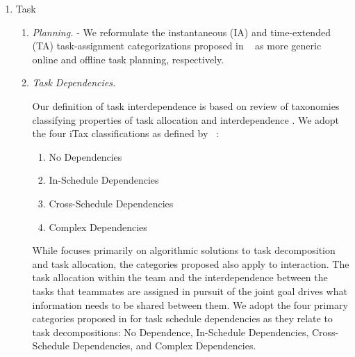 \documentclass[letterpaper, 10 pt, conference]{ieeeconf}  %
\theoremstyle{definition}
\newcommand{\citet}[1]{\citeauthor{#1}~\cite{#1}}
\begin{document}
\begin{enumerate}
    \item Task
    
    
        \begin{enumerate}
            \item \textit{Planning.} \cite{Korsah2013, GerkeyMataric2004} -
            We reformulate the instantaneous (IA) and time-extended (TA) task-assignment categorizations proposed in \citet{GerkeyMataric2004, Korsah2013} as more generic online and offline task planning, respectively.
            
            \item \textit{Task Dependencies.} 

            Our definition of task interdependence is based on review of taxonomies classifying properties of task allocation and interdependence \cite{Korsah2013, GerkeyMataric2004, Phillips2015, Phillips2012}. We adopt the four iTax classifications as defined by \citet{Korsah2013}:
            
            \begin{enumerate}
                \item No Dependencies
                \item In-Schedule Dependencies
                \item Cross-Schedule Dependencies
                \item Complex Dependencies
            \end{enumerate}
            
            
            While \cite{Korsah2013} focuses primarily on algorithmic solutions to task decomposition and task allocation, the categories proposed also apply to interaction. The task allocation within the team and the interdependence between the tasks that teammates are assigned in pursuit of the joint goal drives what information needs to be shared between them. We adopt the four primary categories proposed in \cite{Korsah2013} for task schedule dependencies as they relate to task decompositions: No Dependence, In-Schedule Dependencies, Cross-Schedule Dependencies, and Complex Dependencies. 
            

\end{enumerate}
\end{enumerate}
\end{document}
